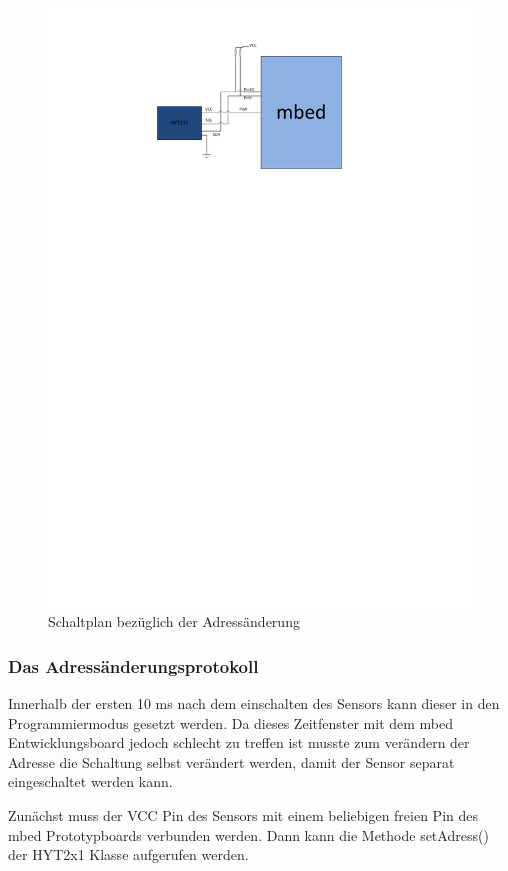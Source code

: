 			\begin{figure}[H]
				\centering
				\includegraphics[width=\textwidth]{Schaltplaene/Umprogrammieren}
				\caption{Schaltplan bezüglich der Adressänderung}
				\label{fig:HYT_Schalt_Umprog}
			\end{figure}

			\subsubsection{Das Adressänderungsprotokoll}
			Innerhalb der ersten 10 ms nach dem einschalten des Sensors kann dieser in den Programmiermodus gesetzt werden. Da dieses Zeitfenster mit dem mbed Entwicklungsboard jedoch schlecht zu treffen ist musste zum verändern der Adresse die Schaltung selbst verändert werden, damit der Sensor separat eingeschaltet werden kann.
			
			Zunächst muss der VCC Pin des Sensors mit einem beliebigen freien Pin des mbed Prototypboards verbunden werden. Dann kann die Methode setAdress() der HYT2x1 Klasse aufgerufen werden.
			
